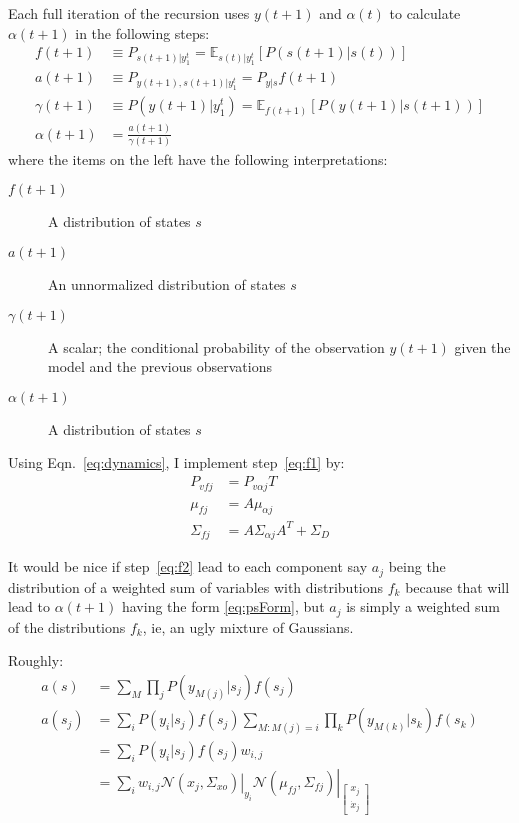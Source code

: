 \documentclass[12pt]{article}
\newcommand{\NormalE}[3]{{\mathcal{N}}\left.\left(#1,#2\right)\right|_{#3}}
\newcommand{\xdot}{{\dot x}}
\newcommand{\field}[1]{\mathbb{#1}}
\newcommand{\EV}[2]{\field{E}_{#1}\left[#2\right]}
\begin{document}
Each full iteration of the recursion uses $y(t+1)$ and $\alpha(t)$ to
calculate $\alpha(t+1)$ in the following steps:
\begin{align}
  \label{eq:f1}
  f(t+1) &\equiv P_{s(t+1)|y_1^t} = \EV{s(t)|y_1^t}{P(s(t+1)|s(t))} \\
  \label{eq:f2}
  a(t+1) &\equiv P_{y(t+1),s(t+1)|y_1^t} = P_{y|s} f(t+1) \\
  \label{eq:f3}
  \gamma(t+1) &\equiv P(y(t+1)|y_1^t) = \EV{f(t+1)}{P(y(t+1)|s(t+1))} \\
  \label{eq:f4}
  \alpha(t+1) &= \frac{a(t+1)}{\gamma(t+1)}
\end{align}
where the items on the left have the following interpretations:
\begin{description}
\item[$f(t+1)$] A distribution of states $s$
\item[$a(t+1)$] An unnormalized distribution of states $s$
\item[$\gamma(t+1)$] A scalar; the conditional probability of the
  observation $y(t+1)$ given the model and the previous observations
\item[$\alpha(t+1)$] A distribution of states $s$
\end{description}

Using Eqn.~\eqref{eq:dynamics}, I implement step~\eqref{eq:f1} by:
\begin{subequations}
  \label{eq:f1I}
  \begin{align}
    P_{vfj} &= P_{v\alpha j} T\\
    \mu_{fj} &= A \mu_{\alpha j}\\
    \Sigma_{fj} &= A \Sigma_{\alpha j} A^T + \Sigma_D
  \end{align}
\end{subequations}

It would be nice if step~\eqref{eq:f2} lead to each component say
$a_j$ being the distribution of a weighted sum of variables with
distributions $f_k$ because that will lead to $\alpha(t+1)$ having the
form \eqref{eq:psForm}, but $a_j$ is simply a weighted sum of the
distributions $f_k$, ie, an ugly mixture of Gaussians.

Roughly:
\begin{align*}
  a(s) &= \sum_M \prod_j P(y_{M(j)}|s_j) f(s_j) \\
  a(s_j) &= \sum_i  P(y_i|s_j) f(s_j) \sum_{M:M(j)=i}  \prod_k
  P(y_{M(k)}|s_k) f(s_k)\\
  &= \sum_i  P(y_i|s_j) f(s_j) w_{i,j} \\
  &= \sum_i  w_{i,j} \NormalE{x_j}{\Sigma_{xo}}{y_i}
  \NormalE{\mu_{fj}}{\Sigma_{fj}}{\begin{bmatrix} x_j\\ \xdot_j
    \end{bmatrix}}
\end{align*}
\end{document}
